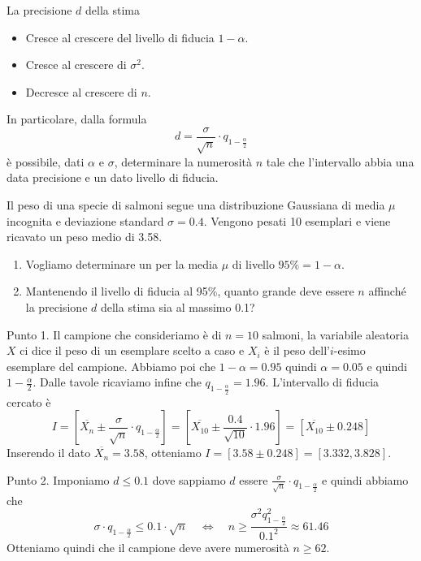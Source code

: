 \begin{observation}
	La precisione $d$ della stima
	\begin{itemize}
		\item Cresce al crescere del livello di fiducia $1-\alpha$.
		\item Cresce al crescere di $\sigma^2$.
		\item Decresce al crescere di $n$.
	\end{itemize}
	In particolare, dalla formula
	\[ d = \frac{\sigma}{\sqrt{n}} \cdot q_{1 - \frac{\alpha}{2}} \]
	è possibile, dati $\alpha$ e $\sigma$, determinare la numerosità $n$ tale che l'intervallo
	abbia una data precisione e un dato livello di fiducia.
\end{observation}

\begin{example}
	Il peso di una specie di salmoni segue una distribuzione Gaussiana di media $\mu$ incognita e
	deviazione standard $\sigma = 0.4$. Vengono pesati 10 esemplari e viene ricavato un peso medio
	di 3.58.
	\begin{enumerate}
		\item Vogliamo determinare un \IF per la media $\mu$ di livello $95\% = 1 - \alpha$.
		\item Mantenendo il livello di fiducia al 95\%, quanto grande deve essere $n$ affinché la
		      precisione $d$ della stima sia al massimo 0.1?
	\end{enumerate}

	Punto 1. Il campione che consideriamo è di $n=10$ salmoni, la variabile aleatoria $X$ ci dice
	il peso di un esemplare scelto a caso e $X_i$ è il peso dell'$i$-esimo esemplare del campione.
	Abbiamo poi che $1-\alpha = 0.95$ quindi $\alpha=0.05$ e quindi $1 - \frac{\alpha}{2}$. Dalle
	tavole ricaviamo infine che $q_{1-\frac{\alpha}{2}} = 1.96$. L'intervallo di fiducia cercato è
	\[
		I = \left[ \overline{X_n} \pm \frac{\sigma}{\sqrt{n}} \cdot q_{1-\frac{\alpha}{2}} \right]
		= \left[ \overline{X_{10}} \pm \frac{0.4}{\sqrt{10}} \cdot 1.96 \right]
		= \left[ \overline{X_{10}} \pm 0.248 \right]
	\]
	Inserendo il dato $\overline{X_n} = 3.58$, otteniamo $I = [3.58 \pm 0.248] = [3.332, 3.828]$.

	Punto 2. Imponiamo $d \leq 0.1$ dove sappiamo $d$ essere
	$\frac{\sigma}{\sqrt{n}} \cdot q_{1-\frac{\alpha}{2}}$ e quindi abbiamo che
	\[
		\sigma \cdot q_{1-\frac{\alpha}{2}} \leq 0.1 \cdot \sqrt{n}
		\quad \Leftrightarrow \quad
		n \geq \frac{\sigma^2 q_{1-\frac{\alpha}{2}}^2}{0.1^2} \approx 61.46
	\]
	Otteniamo quindi che il campione deve avere numerosità $n \geq 62$.
\end{example}

